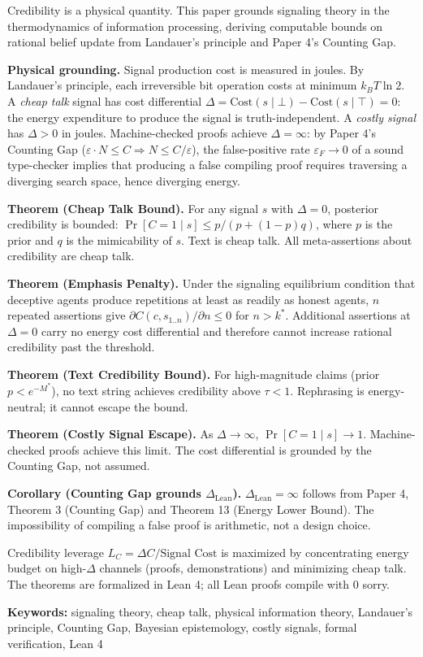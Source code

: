 Credibility is a physical quantity. This paper grounds signaling theory in the thermodynamics
of information processing, deriving computable bounds on rational belief update from Landauer's
principle and Paper 4's Counting Gap.

\textbf{Physical grounding.} Signal production cost is measured in joules.
By Landauer's principle, each irreversible bit operation costs at minimum $k_B T \ln 2$.
A \emph{cheap talk} signal has cost differential $\Delta = \text{Cost}(s \mid \bot) - \text{Cost}(s \mid \top) = 0$:
the energy expenditure to produce the signal is truth-independent.
A \emph{costly signal} has $\Delta > 0$ in joules. Machine-checked proofs achieve $\Delta = \infty$:
by Paper 4's Counting Gap ($\varepsilon \cdot N \leq C \Rightarrow N \leq C/\varepsilon$),
the false-positive rate $\varepsilon_F \to 0$ of a sound type-checker implies that producing
a false compiling proof requires traversing a diverging search space, hence diverging energy.

\textbf{Theorem (Cheap Talk Bound).} For any signal $s$ with $\Delta = 0$, posterior credibility is bounded:
$\Pr[C{=}1 \mid s] \leq p/(p + (1-p)q)$, where $p$ is the prior and $q$ is the mimicability of $s$.
Text is cheap talk. All meta-assertions about credibility are cheap talk.

\textbf{Theorem (Emphasis Penalty).} Under the signaling equilibrium condition that deceptive agents
produce repetitions at least as readily as honest agents, $n$ repeated assertions give
$\partial C(c, s_{1..n})/\partial n \leq 0$ for $n > k^*$. Additional assertions at $\Delta = 0$
carry no energy cost differential and therefore cannot increase rational credibility past the threshold.

\textbf{Theorem (Text Credibility Bound).} For high-magnitude claims (prior $p < e^{-M^*}$),
no text string achieves credibility above $\tau < 1$. Rephrasing is energy-neutral; it cannot escape the bound.

\textbf{Theorem (Costly Signal Escape).} As $\Delta \to \infty$, $\Pr[C=1 \mid s] \to 1$.
Machine-checked proofs achieve this limit. The cost differential is grounded by the Counting Gap,
not assumed.

\textbf{Corollary (Counting Gap grounds $\Delta_\text{Lean}$).} $\Delta_\text{Lean} = \infty$
follows from Paper 4, Theorem 3 (Counting Gap) and Theorem 13 (Energy Lower Bound).
The impossibility of compiling a false proof is arithmetic, not a design choice.

Credibility leverage $L_C = \Delta C / \text{Signal Cost}$ is maximized by concentrating energy
budget on high-$\Delta$ channels (proofs, demonstrations) and minimizing cheap talk.
The theorems are formalized in Lean 4; all Lean proofs compile with 0 sorry.

\textbf{Keywords:} signaling theory, cheap talk, physical information theory, Landauer's principle, Counting Gap, Bayesian epistemology, costly signals, formal verification, Lean 4
